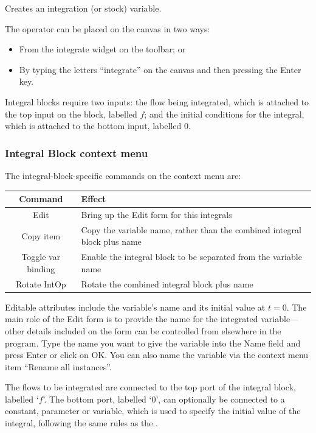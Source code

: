 \label{IntOp} Creates an integration (or stock) variable.


The operator can be placed on the canvas in two ways:
\begin{itemize}
\item From the integrate widget  on the
toolbar; or 
\item By typing the letters ``integrate'' on the canvas and then pressing
the Enter key.
\end{itemize}
Integral blocks require two inputs: the flow being integrated, which
is attached to the top input on the block, labelled $f$; and the
initial conditions for the integral, which is attached to the bottom
input, labelled $0$.

\subsubsection{Integral Block context menu}

The integral-block-specific commands on the context menu are:

\noindent\begin{tabular}{|c|p{}|}
\hline 
Command & Effect\tabularnewline
\hline 
\hline 
Edit & Bring up the Edit form for this integrals\tabularnewline
\hline 
Copy item & Copy the variable name, rather than the combined integral block plus
name\tabularnewline
\hline 
Toggle var binding & Enable the integral block to be separated from the variable name\tabularnewline
\hline 
Rotate IntOp & Rotate the combined integral block plus name\tabularnewline
\hline 
\end{tabular}

Editable attributes include the variable's name and its initial value
at $t=0$. The main role of the Edit form is to provide the name for
the integrated variable---other details included on the form can
be controlled from elsewhere in the program. Type the name you want
to give the variable into the Name field and press Enter or click
on OK. You can also name the variable via the context menu item ``Rename
all instances''.

The flows to be integrated are connected to the top port of the integral
block, labelled `$f$'. The bottom port, labelled `0', can optionally
be connected to a constant, parameter or variable, which is used to
specify the initial value of the integral, following the same rules as
the .

